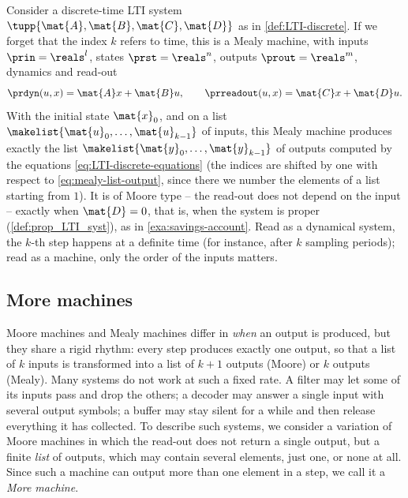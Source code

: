 \begin{example}
    \label{exa:discrete-lti-mealy}
    Consider a discrete-time LTI system $\tupp{\mat{A}, \mat{B}, \mat{C}, \mat{D}}$ as in \cref{def:LTI-discrete}.
    If we forget that the index $k$ refers to time, this is a Mealy machine, with inputs $\prin = \reals^l$, states $\prst = \reals^n$, outputs $\prout = \reals^m$, dynamics and read-out
    \begin{equation}
        \prdyn(u, x) = \mat{A}x + \mat{B}u, \qquad \prreadout(u, x) = \mat{C}x + \mat{D}u.
    \end{equation}
    With the initial state $\mat{x}_0$, and on a list $\makelist{\mat{u}_0, \dots, \mat{u}_{k-1}}$ of inputs, this Mealy machine produces exactly the list $\makelist{\mat{y}_0, \dots, \mat{y}_{k-1}}$ of outputs computed by the equations \cref{eq:LTI-discrete-equations} (the indices are shifted by one with respect to \cref{eq:mealy-list-output}, since there we number the elements of a list starting from $1$).
    It is of Moore type -- the read-out does not depend on the input -- exactly when $\mat{D} = 0$, that is, when the system is proper (\cref{def:prop_LTI_syst}), as in \cref{exa:savings-account}.
    Read as a dynamical system, the $k$-th step happens at a definite time (for instance, after $k$ sampling periods); read as a machine, only the order of the inputs matters.
\end{example}

\subsection{More machines}
\label{sec:more-machines-first}

Moore machines and Mealy machines differ in \emph{when} an output is produced, but they share a rigid rhythm: every step produces exactly one output, so that a list of $k$ inputs is transformed into a list of $k+1$ outputs (Moore) or $k$ outputs (Mealy).
Many systems do not work at such a fixed rate.
A filter may let some of its inputs pass and drop the others; a decoder may answer a single input with several output symbols; a buffer may stay silent for a while and then release everything it has collected.
To describe such systems, we consider a variation of Moore machines in which the read-out does not return a single output, but a finite \emph{list} of outputs, which may contain several elements, just one, or none at all.
Since such a machine can output more than one element in a step, we call it a \emph{More machine}.

